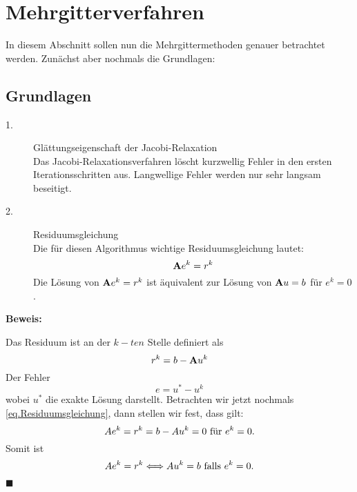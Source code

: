 \chapter{Mehrgitterverfahren}\label{c.Mehrgitterverfahren}

In diesem Abschnitt sollen nun die Mehrgittermethoden genauer betrachtet werden. Zunächst aber nochmals die Grundlagen:

\section{Grundlagen}\label{s.Idee MGM}

\begin{description}

\item[1.] Glättungseigenschaft der Jacobi-Relaxation \\
Das Jacobi-Relaxationsverfahren löscht kurzwellig Fehler in den ersten Iterationsschritten aus. Langwellige Fehler werden nur sehr langsam beseitigt.
\item[2.] Residuumsgleichung \\
Die für diesen Algorithmus wichtige Residuumsgleichung lautet:
\begin{equation}
{\textbf{A}} e^{k} = r^{k}\label{eq.Residuumsgleichung}
\end{equation}
Die Lösung von ${\textbf{A}} e^{k} = r^{k}$ ist äquivalent zur Lösung von ${\textbf{A}}u=b$ für $e^{k} = 0$.

\end{description}

\textbf{Beweis:}

Das Residuum ist an der $k-ten$ Stelle definiert als 
\begin{equation}
r^{k} = b - {\textbf{A}}u^{k}
\end{equation}
Der Fehler
\begin{equation}
e = u^{*} - u^{k}\label{eq.Fehler}
\end{equation}
wobei $u^{*}$ die exakte Lösung darstellt.
Betrachten wir jetzt nochmals \autoref{eq.Residuumsgleichung}, dann stellen wir fest, dass gilt:
\begin{equation}
Ae^{k} = r^{k} = b - Au^{k} = 0 \textnormal{ für } e^{k} = 0.
\end{equation}
Somit ist
\begin{equation}
Ae^{k} = r^{k} \Longleftrightarrow Au^{k} = b \textnormal{ falls } e^{k} = 0.
\end{equation}
\begin{flushright}
$\blacksquare$
\end{flushright}

